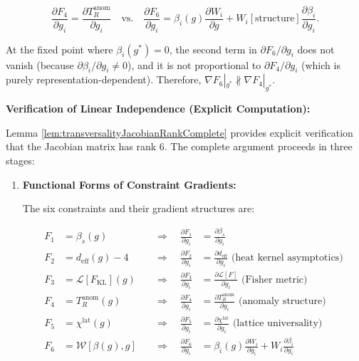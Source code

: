 {\begin{remark}
\begin{equation}
\frac{\partial F_4}{\partial g_i} = \frac{\partial T_R^{\text{anom}}}{\partial g_i} \quad \text{vs.} \quad \frac{\partial F_6}{\partial g_i} = \beta_i(g) \frac{\partial W_i}{\partial g} + W_i[\text{structure}] \frac{\partial \beta_i}{\partial g_i}.
\end{equation}

At the fixed point where $\beta_i(g^*) = 0$, the second term in $\partial F_6/\partial g_i$ does not vanish (because $\partial \beta_i/\partial g_i \neq 0$), and it is not proportional to $\partial F_4/\partial g_i$ (which is purely representation-dependent). Therefore, $\nabla F_6|_{g^*} \not\parallel \nabla F_4|_{g^*}$.

\textbf{Verification of Linear Independence (Explicit Computation):}

Lemma \ref{lem:transversalityJacobianRankComplete} provides explicit verification that the Jacobian matrix has rank 6. The complete argument proceeds in three stages:

\begin{enumerate}

\item \textbf{Functional Forms of Constraint Gradients:}

The six constraints and their gradient structures are:

\begin{align}
F_1 &= \beta_s(g) \quad &\Rightarrow \quad \frac{\partial F_1}{\partial g_i} &= \frac{\partial \beta_s}{\partial g_i} \\
F_2 &= d_{\mathrm{eff}}(g) - 4 \quad &\Rightarrow \quad \frac{\partial F_2}{\partial g_i} &= \frac{\partial d_{\mathrm{eff}}}{\partial g_i} \text{ (heat kernel asymptotics)} \\
F_3 &= \mathcal{L}[F_{\mathrm{KL}}](g) \quad &\Rightarrow \quad \frac{\partial F_3}{\partial g_i} &= \frac{\partial \mathcal{L}[F]}{\partial g_i} \text{ (Fisher metric)} \\
F_4 &= T_R^{\mathrm{anom}}(g) \quad &\Rightarrow \quad \frac{\partial F_4}{\partial g_i} &= \frac{\partial T_R^{\mathrm{anom}}}{\partial g_i} \text{ (anomaly structure)} \\
F_5 &= \chi^{\mathrm{lat}}(g) \quad &\Rightarrow \quad \frac{\partial F_5}{\partial g_i} &= \frac{\partial \chi^{\mathrm{lat}}}{\partial g_i} \text{ (lattice universality)} \\
F_6 &= \mathcal{W}[\beta(g), g] \quad &\Rightarrow \quad \frac{\partial F_6}{\partial g_i} &= \beta_i(g) \frac{\partial W_i}{\partial g_i} + W_i \frac{\partial \beta_i}{\partial g_i}
\end{align}


\end{enumerate}
\end{remark}}
